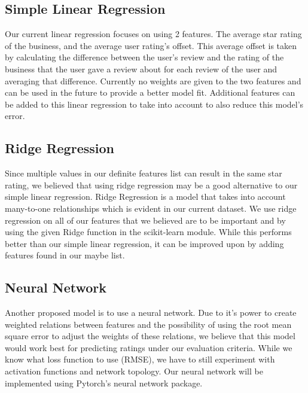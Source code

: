 \documentclass[notitlepage,11pt]{article}
\begin{document}
\subsection{Simple Linear Regression}
Our current linear regression focuses on using 2 features. The average star rating of the business, and the average user rating's offset. This average offset is taken by calculating the difference between the user's review and the rating of the business that the user gave a review about for each review of the user and averaging that difference.  Currently no weights are given to the two features and can be used in the future to provide a better model fit. Additional features can be added to this linear regression to take into account to also reduce this model's error.

\subsection{Ridge  Regression}
Since multiple values in our definite features list can result in the same star rating, we believed that using ridge regression may be a good alternative to our simple linear regression. Ridge Regression is a model that takes into account many-to-one relationships which is evident in our current dataset. We use ridge regression on all of our features that we believed are to be important and by using the given Ridge function in the scikit-learn module. While this performs better than our simple linear regression, it can be improved upon by adding features found in our maybe list. 

\subsection{Neural Network}
Another proposed model is to use a neural network. Due to it's power to create weighted relations between features and the possibility of using the root mean square error to adjust the weights of these relations, we believe that this model would work best for predicting ratings under our evaluation criteria. While we know what loss function to use (RMSE), we have to still experiment with activation functions and network topology. Our neural network will be implemented using Pytorch's neural network package. 
\end{document}
